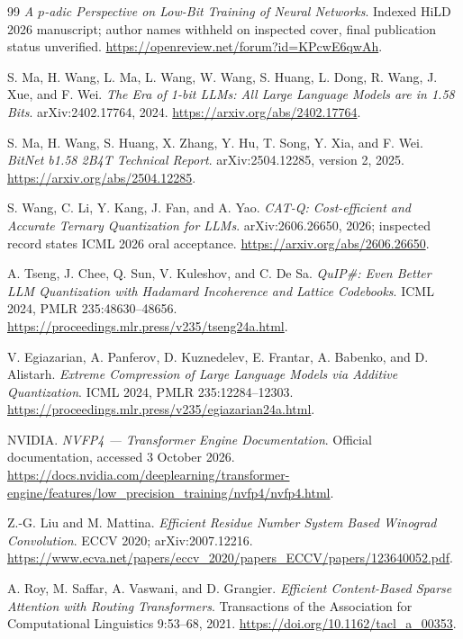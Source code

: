 \documentclass[11pt]{article}
\begin{document}
\begin{thebibliography}{99}
\emph{A \(p\)-adic Perspective on Low-Bit Training of Neural Networks}.
Indexed HiLD 2026 manuscript; author names withheld on inspected cover,
final publication status unverified.
\url{https://openreview.net/forum?id=KPcwE6qwAh}.

S. Ma, H. Wang, L. Ma, L. Wang, W. Wang, S. Huang, L. Dong,
R. Wang, J. Xue, and F. Wei.
\emph{The Era of 1-bit LLMs: All Large Language Models are in 1.58 Bits}.
arXiv:2402.17764, 2024. \url{https://arxiv.org/abs/2402.17764}.

S. Ma, H. Wang, S. Huang, X. Zhang, Y. Hu, T. Song, Y. Xia, and F. Wei.
\emph{BitNet b1.58 2B4T Technical Report}.
arXiv:2504.12285, version 2, 2025.
\url{https://arxiv.org/abs/2504.12285}.

S. Wang, C. Li, Y. Kang, J. Fan, and A. Yao.
\emph{CAT-Q: Cost-efficient and Accurate Ternary Quantization for LLMs}.
arXiv:2606.26650, 2026; inspected record states ICML 2026 oral acceptance.
\url{https://arxiv.org/abs/2606.26650}.

A. Tseng, J. Chee, Q. Sun, V. Kuleshov, and C. De Sa.
\emph{QuIP\#: Even Better LLM Quantization with Hadamard Incoherence and
Lattice Codebooks}. ICML 2024, PMLR 235:48630--48656.
\url{https://proceedings.mlr.press/v235/tseng24a.html}.

V. Egiazarian, A. Panferov, D. Kuznedelev, E. Frantar, A. Babenko, and D. Alistarh.
\emph{Extreme Compression of Large Language Models via Additive Quantization}.
ICML 2024, PMLR 235:12284--12303.
\url{https://proceedings.mlr.press/v235/egiazarian24a.html}.

NVIDIA. \emph{NVFP4 --- Transformer Engine Documentation}.
Official documentation, accessed 3 October 2026.
\url{https://docs.nvidia.com/deeplearning/transformer-engine/features/low_precision_training/nvfp4/nvfp4.html}.

Z.-G. Liu and M. Mattina.
\emph{Efficient Residue Number System Based Winograd Convolution}.
ECCV 2020; arXiv:2007.12216.
\url{https://www.ecva.net/papers/eccv_2020/papers_ECCV/papers/123640052.pdf}.

A. Roy, M. Saffar, A. Vaswani, and D. Grangier.
\emph{Efficient Content-Based Sparse Attention with Routing Transformers}.
Transactions of the Association for Computational Linguistics 9:53--68, 2021.
\url{https://doi.org/10.1162/tacl_a_00353}.


\end{thebibliography}
\end{document}
